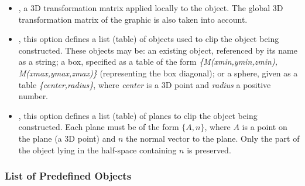 \begin{itemize}
\begin{itemize}
            \item {}, , and : three parameters defining the \emph{finish}.

            \item {}, this parameter allows specifying a texture directly as a string or referencing an existing \povray texture. In that case, the previous parameters are ignored. For example:  (this texture is declared in the file \emph{textures.inc}).
        \end{itemize}

    \item {}, a 3D transformation matrix applied locally to the object. The global 3D transformation matrix of the graphic is also taken into account.

    \item {}, this option defines a list (table) of objects used to clip the object being constructed. These objects may be: an existing object, referenced by its name as a string; a box, specified as a table of the form \emph{\{M(xmin,ymin,zmin), M(xmax,ymax,zmax)\}} (representing the box diagonal); or a sphere, given as a table \emph{\{center,radius\}}, where \emph{center} is a 3D point and \emph{radius} a positive number.

    \item {}, this option defines a list (table) of planes to clip the object being constructed. Each plane must be of the form $\{A, n\}$, where $A$ is a point on the plane (a 3D point) and $n$ the normal vector to the plane. Only the part of the object lying in the half-space containing $n$ is preserved.
\end{itemize}


\subsubsection{List of Predefined Objects}

